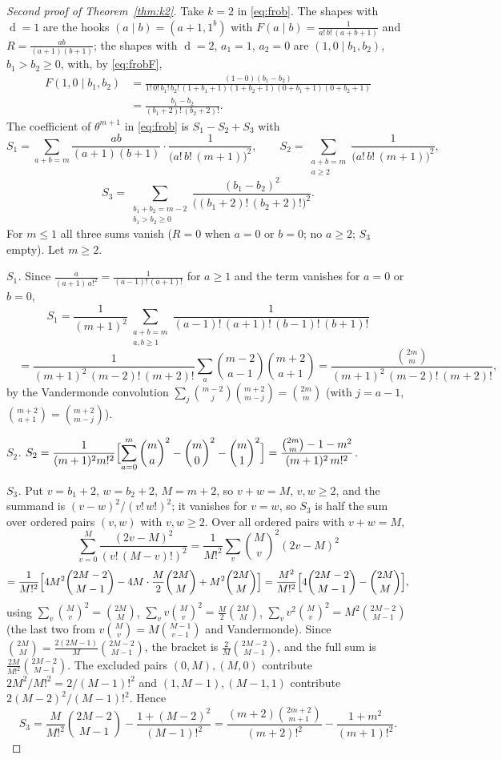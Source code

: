 \documentclass[11pt]{article}
\theoremstyle{definition}
\theoremstyle{remark}
\DeclareMathOperator{\Durfee}{d}
\begin{document}
\begin{proof}[Second proof of Theorem~\ref{thm:k2}]
Take $k=2$ in \eqref{eq:frob}. The shapes with $\Durfee=1$ are the hooks $(a\mid b)=(a+1,1^b)$ with $F(a\mid b)=\frac{1}{a!\,b!\,(a+b+1)}$ and $R=\frac{ab}{(a+1)(b+1)}$; the shapes with $\Durfee=2$, $a_1=1$, $a_2=0$ are $(1,0\mid b_1,b_2)$, $b_1>b_2\ge0$, with, by \eqref{eq:frobF},
\begin{align*}
F(1,0\mid b_1,b_2)&=\frac{(1-0)(b_1-b_2)}{1!\,0!\,b_1!\,b_2!\,(1+b_1+1)(1+b_2+1)(0+b_1+1)(0+b_2+1)}\\
&=\frac{b_1-b_2}{(b_1+2)!\,(b_2+2)!}.
\end{align*}
The coefficient of $\theta^{m+1}$ in \eqref{eq:frob} is $S_1-S_2+S_3$ with
\[
S_1=\sum_{a+b=m}\frac{ab}{(a+1)(b+1)}\cdot\frac{1}{\bigl(a!\,b!\,(m+1)\bigr)^2},\qquad
S_2=\sum_{\substack{a+b=m\\ a\ge2}}\frac{1}{\bigl(a!\,b!\,(m+1)\bigr)^2},
\]
\[
S_3=\sum_{\substack{b_1+b_2=m-2\\ b_1>b_2\ge0}}\frac{(b_1-b_2)^2}{\bigl((b_1+2)!\,(b_2+2)!\bigr)^2}.
\]
For $m\le1$ all three sums vanish ($R=0$ when $a=0$ or $b=0$; no $a\ge2$; $S_3$ empty). Let $m\ge2$.

\emph{$S_1$.} Since $\frac{a}{(a+1)\,a!^2}=\frac{1}{(a-1)!\,(a+1)!}$ for $a\ge1$ and the term vanishes for $a=0$ or $b=0$,
\[
S_1=\frac1{(m+1)^2}\sum_{\substack{a+b=m\\ a,b\ge1}}\frac{1}{(a-1)!\,(a+1)!\,(b-1)!\,(b+1)!}
\]
\[
\phantom{S_1}=\frac{1}{(m+1)^2\,(m-2)!\,(m+2)!}\sum_{a}\binom{m-2}{a-1}\binom{m+2}{a+1}
=\frac{\binom{2m}m}{(m+1)^2\,(m-2)!\,(m+2)!},
\]
by the Vandermonde convolution $\sum_j\binom{m-2}{j}\binom{m+2}{m-j}=\binom{2m}m$ (with $j=a-1$, $\binom{m+2}{a+1}=\binom{m+2}{m-j}$).

\emph{$S_2$.} $\displaystyle S_2=\frac{1}{(m+1)^2m!^2}\Bigl[\sum_{a=0}^m\binom ma^2-\binom m0^2-\binom m1^2\Bigr]=\frac{\binom{2m}m-1-m^2}{(m+1)^2\,m!^2}$.

\emph{$S_3$.} Put $v=b_1+2$, $w=b_2+2$, $M=m+2$, so $v+w=M$, $v,w\ge2$, and the summand is $(v-w)^2/(v!\,w!)^2$; it vanishes for $v=w$, so $S_3$ is half the sum over ordered pairs $(v,w)$ with $v,w\ge2$. Over all ordered pairs with $v+w=M$,
\[
\sum_{v=0}^M\frac{(2v-M)^2}{(v!\,(M-v)!)^2}=\frac{1}{M!^2}\sum_v\binom Mv^2(2v-M)^2
\]
\[
=\frac{1}{M!^2}\Bigl[4M^2\binom{2M-2}{M-1}-4M\cdot\frac M2\binom{2M}M+M^2\binom{2M}M\Bigr]
=\frac{M^2}{M!^2}\Bigl[4\binom{2M-2}{M-1}-\binom{2M}M\Bigr],
\]
using $\sum_v\binom Mv^2=\binom{2M}M$, $\sum_vv\binom Mv^2=\frac M2\binom{2M}M$, $\sum_vv^2\binom Mv^2=M^2\binom{2M-2}{M-1}$ (the last two from $v\binom Mv=M\binom{M-1}{v-1}$ and Vandermonde). Since $\binom{2M}M=\frac{2(2M-1)}M\binom{2M-2}{M-1}$, the bracket is $\frac2M\binom{2M-2}{M-1}$, and the full sum is $\frac{2M}{M!^2}\binom{2M-2}{M-1}$. The excluded pairs $(0,M),(M,0)$ contribute $2M^2/M!^2=2/(M-1)!^2$ and $(1,M-1),(M-1,1)$ contribute $2(M-2)^2/(M-1)!^2$. Hence
\[
S_3=\frac{M}{M!^2}\binom{2M-2}{M-1}-\frac{1+(M-2)^2}{(M-1)!^2}
=\frac{(m+2)\binom{2m+2}{m+1}}{(m+2)!^2}-\frac{1+m^2}{(m+1)!^2}.
\]


\end{proof}
\end{document}

